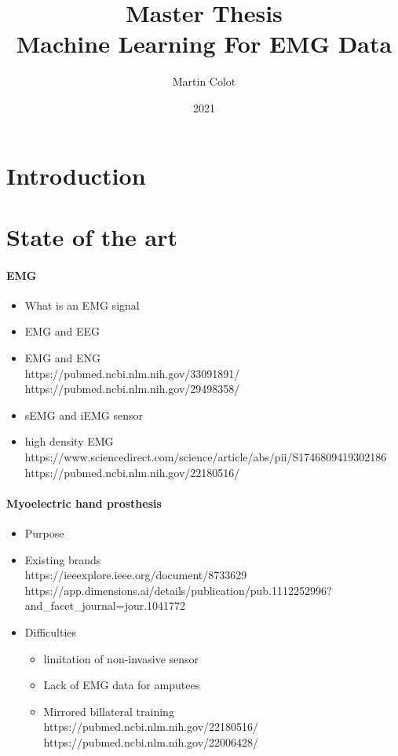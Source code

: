 \documentclass{article}
\title{Master Thesis\\Machine Learning For EMG Data}
\author{Martin Colot}
\date{2021}
\begin{document}
\maketitle


\part{Introduction}


\part{State of the art}



\subsection{EMG}

\begin{itemize}
    \item What is an EMG signal
    \item EMG and EEG
    \item EMG and ENG \\
    https://pubmed.ncbi.nlm.nih.gov/33091891/  \\
    https://pubmed.ncbi.nlm.nih.gov/29498358/
    \item sEMG and iEMG sensor
    \item high density EMG \\
    https://www.sciencedirect.com/science/article/abs/pii/S1746809419302186 \\
    https://pubmed.ncbi.nlm.nih.gov/22180516/
\end{itemize}


\subsection{Myoelectric hand prosthesis}

\begin{itemize}
    \item Purpose
    \item Existing brands \\
    https://ieeexplore.ieee.org/document/8733629 \\
    https://app.dimensions.ai/details/publication/pub.1112252996?and\_facet\_journal=jour.1041772
    \item Difficulties
    \begin{itemize}
        \item limitation of non-invasive sensor
        \item Lack of EMG data for amputees
        \item Mirrored billateral training \\
        https://pubmed.ncbi.nlm.nih.gov/22180516/ \\
        https://pubmed.ncbi.nlm.nih.gov/22006428/
    \end{itemize}
\end{itemize}
\end{document}
